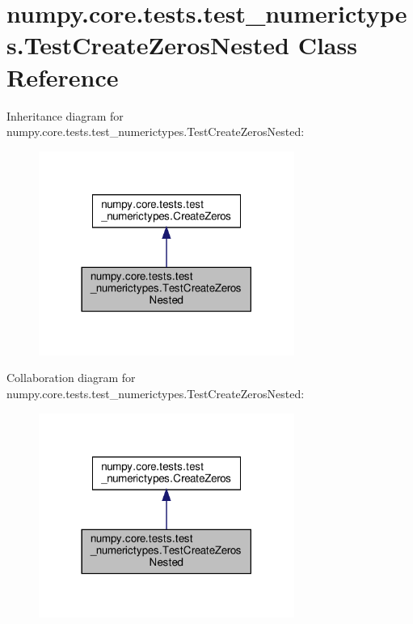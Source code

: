 \hypertarget{classnumpy_1_1core_1_1tests_1_1test__numerictypes_1_1TestCreateZerosNested}{}\section{numpy.\+core.\+tests.\+test\+\_\+numerictypes.\+Test\+Create\+Zeros\+Nested Class Reference}
\label{classnumpy_1_1core_1_1tests_1_1test__numerictypes_1_1TestCreateZerosNested}


Inheritance diagram for numpy.\+core.\+tests.\+test\+\_\+numerictypes.\+Test\+Create\+Zeros\+Nested\+:
\nopagebreak
\begin{figure}[H]
\begin{center}
\leavevmode
\includegraphics[width=237pt]{classnumpy_1_1core_1_1tests_1_1test__numerictypes_1_1TestCreateZerosNested__inherit__graph}
\end{center}
\end{figure}


Collaboration diagram for numpy.\+core.\+tests.\+test\+\_\+numerictypes.\+Test\+Create\+Zeros\+Nested\+:
\nopagebreak
\begin{figure}[H]
\begin{center}
\leavevmode
\includegraphics[width=237pt]{classnumpy_1_1core_1_1tests_1_1test__numerictypes_1_1TestCreateZerosNested__coll__graph}
\end{center}
\end{figure}

